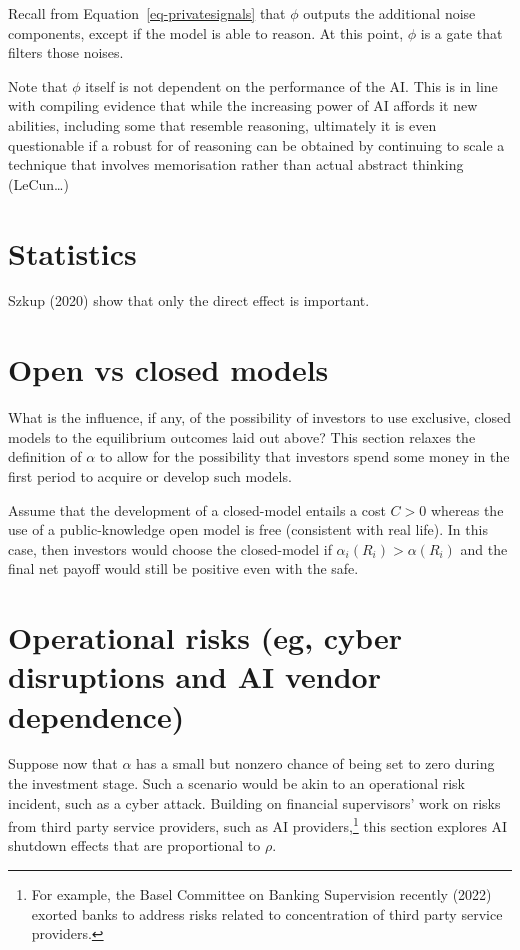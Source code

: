 \documentclass[
]{article}
\theoremstyle{plain}
\theoremstyle{remark}
\begin{document}
Recall from Equation~\ref{eq-privatesignals} that \(\phi\) outputs the
additional noise components, except if the model is able to reason. At
this point, \(\phi\) is a gate that filters those noises.

Note that \(\phi\) itself is not dependent on the performance of the AI.
This is in line with compiling evidence that while the increasing power
of AI affords it new abilities, including some that resemble reasoning,
ultimately it is even questionable if a robust for of reasoning can be
obtained by continuing to scale a technique that involves memorisation
rather than actual abstract thinking (LeCun\ldots)

\section{Statistics}\label{statistics}

Szkup (2020) show that only the direct effect is important.

\section{Open vs closed models}\label{sec-closedmodels}

What is the influence, if any, of the possibility of investors to use
exclusive, closed models to the equilibrium outcomes laid out above?
This section relaxes the definition of \(\alpha\) to allow for the
possibility that investors spend some money in the first period to
acquire or develop such models.

Assume that the development of a closed-model entails a cost \(C > 0\)
whereas the use of a public-knowledge open model is free (consistent
with real life). In this case, then investors would choose the
closed-model if \(\alpha_i(R_i) > \alpha(R_i)\) and the final net payoff
would still be positive even with the safe.

\section{Operational risks (eg, cyber disruptions and AI vendor
dependence)}\label{operational-risks-eg-cyber-disruptions-and-ai-vendor-dependence}

Suppose now that \(\alpha\) has a small but nonzero chance of being set
to zero during the investment stage. Such a scenario would be akin to an
operational risk incident, such as a cyber attack. Building on financial
supervisors' work on risks from third party service providers, such as
AI providers,\footnote{For example, the Basel Committee on Banking
  Supervision recently (2022) exorted banks to address risks related to
  concentration of third party service providers.} this section explores
AI shutdown effects that are proportional to \(\rho\).
\end{document}
